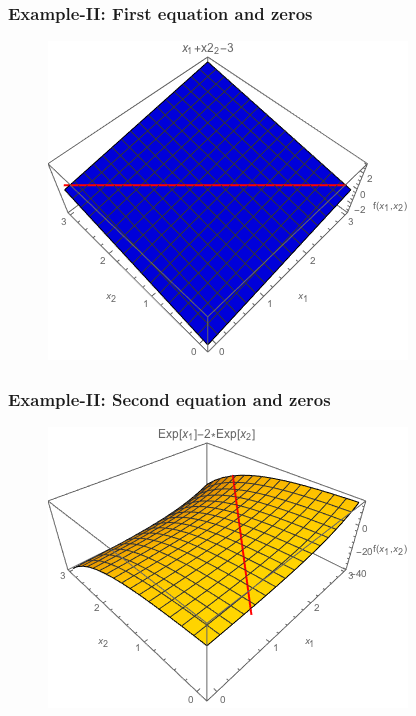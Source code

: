 \documentclass{beamer}
\begin{document}
\begin{frame}
\frametitle[alignment=center]{Example-II: First equation and zeros}
\begin{figure}[htdb!]
\centering
\includegraphics[scale=0.7]{NewtonsMethod_2d_1.png}
\end{figure}

\end{frame}

\begin{frame}
\frametitle[alignment=center]{Example-II: Second equation and zeros}
\begin{figure}[htdb!]
\centering
\includegraphics[scale=0.7]{NewtonsMethod_2d_2.png}
\end{figure}
\end{frame}
\end{document}
